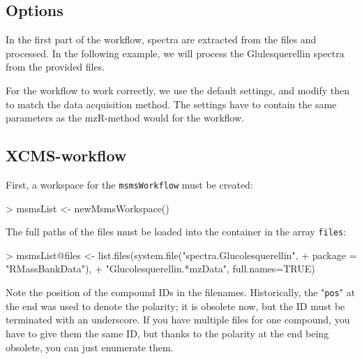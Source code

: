 \documentclass[letterpaper, 11pt]{article}
\newcommand{\Rvar}[1]{{\texttt{#1}}}
\begin{document}
\subsection{Options}

In the first part of the workflow, spectra are extracted from the files and processed. In the following example, we will process the Glulesquerellin spectra from the provided files.

For the workflow to work correctly, we use the default settings, and modify then to match the data acquisition method. The settings have to contain the same parameters as the mzR-method would for the workflow.

\begin{Schunk}
\end{Schunk}


\subsection{XCMS-workflow}

First, a workspace for the \Rvar{msmsWorkflow} must be created:
\begin{Schunk}
\begin{Sinput}
> msmsList <- newMsmsWorkspace()
\end{Sinput}
\end{Schunk}

The full paths of the files must be loaded into the container in the array
\Rvar{files}:

\begin{Schunk}
\begin{Sinput}
> msmsList@files <- list.files(system.file("spectra.Glucolesquerellin", 
+                                          package = "RMassBankData"), 
+                              "Glucolesquerellin.*mzData", full.names=TRUE)
\end{Sinput}
\end{Schunk}

Note the position of the compound IDs in the filenames. Historically, the "\Rvar{pos}" at the end was used to denote the polarity; it is obsolete now, but the ID must be terminated with an underscore.
If you have multiple files for one compound, you have to give them the same ID, but thanks to the polarity at the end being obsolete, you can just enumerate them.
\end{document}
